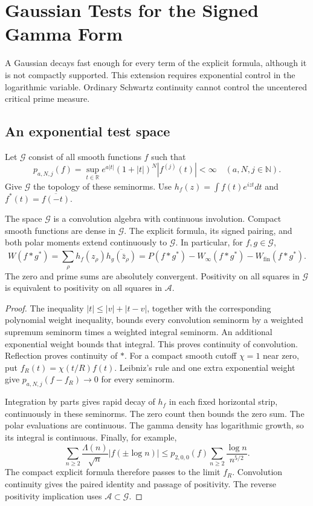 \chapter{Gaussian Tests for the Signed Gamma Form}
\label{v4-arith:w7-d:chapter}

A Gaussian decays fast enough for every term of the explicit formula,
although it is not compactly supported. This extension requires
exponential control in the logarithmic variable. Ordinary Schwartz
continuity cannot control the uncentered critical prime measure.

\section{An exponential test space}
\begin{definition}
Let $\mathscr G$ consist of all smooth functions $f$ such that
\[
 p_{a,N,j}(f)=\sup_{t\in\mathbb R}
 e^{a|t|}(1+|t|)^N|f^{(j)}(t)|<\infty
 \quad(a,N,j\in\mathbb N).
\]
Give $\mathscr G$ the topology of these seminorms. Use
$h_f(z)=\int f(t)e^{izt}dt$ and $f^*(t)=\overline{f(-t)}$.
\end{definition}

\begin{proposition}
\label{v4-arith:sc:gaussian-extension}
The space $\mathscr G$ is a convolution algebra with continuous
involution. Compact smooth functions are dense in $\mathscr G$.
The explicit formula, its signed pairing, and both polar moments
extend continuously to $\mathscr G$.
In particular, for $f,g\in\mathscr G$,
\[
 W(f*g^*)=\sum_\rho h_f(z_\rho)\overline{h_g(\bar z_\rho)}
 =P(f*g^*)-W_\infty(f*g^*)-W_{\mathrm{fin}}(f*g^*).
\]
The zero and prime sums are absolutely convergent. Positivity on
all squares in $\mathscr G$ is equivalent to positivity on all
squares in $\mathscr A$.
\end{proposition}
\begin{proof}
The inequality $|t|\le|v|+|t-v|$, together with the corresponding
polynomial weight inequality, bounds every convolution seminorm
by a weighted supremum seminorm times a weighted integral seminorm.
An additional exponential weight bounds that integral. This proves
continuity of convolution. Reflection proves continuity of $*$.
For a compact smooth cutoff $\chi=1$ near zero, put
$f_R(t)=\chi(t/R)f(t)$. Leibniz's rule and one extra exponential
weight give $p_{a,N,j}(f-f_R)\to0$ for every seminorm.

Integration by parts gives rapid decay of $h_f$ in each fixed
horizontal strip, continuously in these seminorms. The zero count
then bounds the zero sum. The polar evaluations are continuous.
The gamma density has logarithmic growth, so its integral is
continuous. Finally, for example,
\[
 \sum_{n\ge2}\frac{\Lambda(n)}{\sqrt n}|f(\pm\log n)|
 \le p_{2,0,0}(f)\sum_{n\ge2}\frac{\log n}{n^{5/2}}.
\]
The compact explicit formula therefore passes to the limit $f_R$.
Convolution continuity gives the paired identity and passage of
positivity. The reverse positivity implication uses
$\mathscr A\subset\mathscr G$.
\end{proof}

